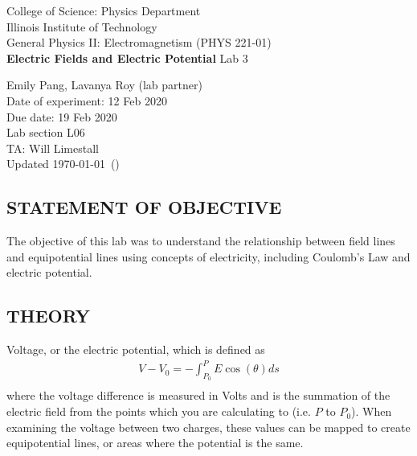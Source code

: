 \documentclass [12pt, letterpaper, twoside] {article}
\begin{document}
\begin {titlepage}
\begin {center}
College of Science: Physics Department \\
\vspace {0.1cm}
Illinois Institute of Technology\\
\vspace {0.1cm}
General Physics II: Electromagnetism (PHYS 221-01)\\
\vspace* {\fill}
\begingroup
\Large
\textbf {Electric Fields and Electric Potential}
\vspace {0.35cm}
\normalsize
Lab 3
\vspace {1.5cm}
\endgroup
\vspace* {\fill}
\end {center}

\vspace*{\fill}
\begin {flushright}
\footnotesize
Emily Pang, Lavanya Roy (lab partner) \\
Date of experiment: 12 Feb 2020 \\
Due date: 19 Feb 2020 \\
Lab section L06 \\
TA: Will Limestall \\
Updated \usdate\today~(\currenttime)
\end {flushright}
\end {titlepage}
\subsection* {STATEMENT OF OBJECTIVE}
The objective of this lab was to understand the relationship between field lines and equipotential lines using concepts of electricity, including Coulomb's Law and electric potential.

\subsection* {THEORY}
Voltage, or the electric potential, which is defined as
\begin{equation}
  \begin{split}
    V - V_{0} = -\int_{P_{0}}^{P}E\cos(\theta)ds \\
  \end{split}
\end{equation}
where the voltage difference is measured in Volts and is the summation of the electric field from the points which you are calculating to (i.e. \(P\) to \(P_{0}\)).\cite{labManual} When examining the voltage between two charges, these values can be mapped to create equipotential lines, or areas where the potential is the same. 
\end{document}
